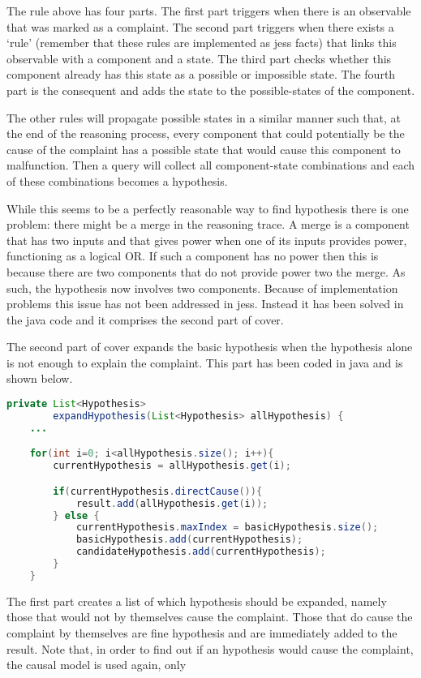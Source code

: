 The rule above has four parts. The first part triggers when there is an observable that was marked as a complaint. The second part triggers when there exists a `rule' (remember that these rules are implemented as jess facts) that links this observable with a component and a state. The third part checks whether this component already has this state as a possible or impossible state. The fourth part is the consequent and adds the state to the possible-states of the component.

The other rules will propagate possible states in a similar manner such that, at the end of the reasoning process, every component that could potentially be the cause of the complaint has a possible state that would cause this component to malfunction. Then a query will collect all component-state combinations and each of these combinations becomes a hypothesis.

While this seems to be a perfectly reasonable way to find hypothesis there is one problem: there might be a merge in the reasoning trace. A merge is a component that has two inputs and that gives power when one of its inputs provides power, functioning as a logical OR. If such a component has no power then this is because there are two components that do not provide power two the merge. As such, the hypothesis now involves two components. Because of implementation problems this issue has not been addressed in jess. Instead it has been solved in the java code and it comprises the second part of cover.

The second part of cover expands the basic hypothesis when the hypothesis alone is not enough to explain the complaint. This part has been coded in java and is shown below.

\begin{lstlisting}[language=Java]
private List<Hypothesis>
        expandHypothesis(List<Hypothesis> allHypothesis) {
    ...

    for(int i=0; i<allHypothesis.size(); i++){
        currentHypothesis = allHypothesis.get(i);

        if(currentHypothesis.directCause()){
            result.add(allHypothesis.get(i));
        } else {
            currentHypothesis.maxIndex = basicHypothesis.size();
            basicHypothesis.add(currentHypothesis);
            candidateHypothesis.add(currentHypothesis); 
        }
    }
\end{lstlisting}

The first part creates a list of which hypothesis should be expanded, namely those that would not by themselves cause the complaint. Those that do cause the complaint by themselves are fine hypothesis and are immediately added to the result. Note that, in order to find out if an hypothesis would cause the complaint, the causal model is used again, only 

